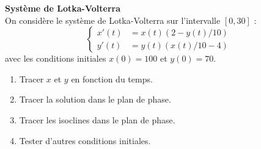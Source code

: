 \documentclass[12pt]{article}
\begin{document}
\begin{exo}\textbf{Syst\`eme de Lotka-Volterra}\\
On consid\`ere le syst\`eme de Lotka-Volterra sur l'intervalle $[0,30]$ :
$$
\left\{
\begin{array}{rl}
x'(t)&=x(t)(2-y(t)/10)\\
y'(t)&=y(t)(x(t)/10-4)
\end{array}
\right.
$$
avec les conditions initiales $x(0)=100$ et $y(0)=70$.
\begin{enumerate}
\item Tracer $x$ et $y$ en fonction du temps.
\item Tracer la solution dans le plan de phase.
\item Tracer les isoclines dans le plan de phase. 
\item Tester d'autres conditions initiales.
\end{enumerate}
\end{exo}
\end{document}
